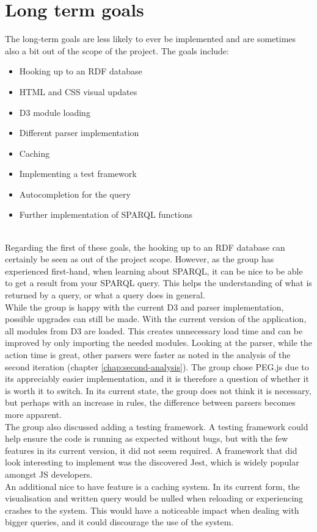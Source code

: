 \section{Long term goals}
The long-term goals are less likely to ever be implemented and are sometimes also a bit out of the scope of the project. The goals include:
\begin{itemize}
    \item Hooking up to an RDF database
    \item HTML and CSS visual updates
    \item D3 module loading
    \item Different parser implementation
    \item Caching
    \item Implementing a test framework
    \item Autocompletion for the query
    \item Further implementation of SPARQL functions
\end{itemize}
\\
Regarding the first of these goals, the hooking up to an RDF database can certainly be seen as out of the project scope. However, as the group has experienced first-hand, when learning about SPARQL, it can be nice to be able to get a result from your SPARQL query. This helps the understanding of what is returned by a query, or what a query does in general. \\
While the group is happy with the current D3 and parser implementation, possible upgrades can still be made. With the current version of the application, all modules from D3 are loaded. This creates unnecessary load time and can be improved by only importing the needed modules. Looking at the parser, while the action time is great, other parsers were faster as noted in the analysis of the second iteration (chapter \ref{chap:second-analysis}). The group chose PEG.js due to its appreciably easier implementation, and it is therefore a question of whether it is worth it to switch. In its current state, the group does not think it is necessary, but perhaps with an increase in rules, the difference between parsers becomes more apparent. \\
The group also discussed adding a testing framework. A testing framework could help ensure the code is running as expected without bugs, but with the few features in its current version, it did not seem required. A framework that did look interesting to implement was the discovered Jest, which is widely popular amongst JS developers\cite{Jest}. \\
An additional nice to have feature is a caching system. In its current form, the visualisation and written query would be nulled when reloading or experiencing crashes to the system. This would have a noticeable impact when dealing with bigger queries, and it could discourage the use of the system.

